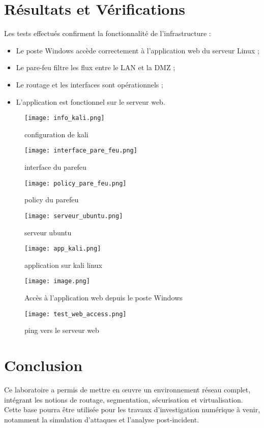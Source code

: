 \documentclass[a4paper,12pt]{report}
\begin{document}
\chapter{Résultats et Vérifications}
Les tests effectués confirment la fonctionnalité de l’infrastructure :
\begin{itemize}
    \item Le poste Windows accède correctement à l’application web du serveur Linux ;
    \item Le pare-feu filtre les flux entre le LAN et la DMZ ;
    \item Le routage et les interfaces sont opérationnels ;
    \item L'application est fonctionnel sur le serveur web.
\end{itemize}

\begin{figure}
    \centering
    \texttt{[image: info\_kali.png]}
    \caption{configuration de kali}
    \label{fig:placeholder}
\end{figure}
\begin{figure}
    \centering
    \texttt{[image: interface\_pare\_feu.png]}
    \caption{interface du parefeu}
    \label{fig:placeholder}
\end{figure}
\begin{figure}
    \centering
    \texttt{[image: policy\_pare\_feu.png]}
    \caption{policy du parefeu}
    \label{fig:placeholder}
\end{figure}
\begin{figure}
    \centering
    \texttt{[image: serveur\_ubuntu.png]}
    \caption{serveur ubuntu}
    \label{fig:placeholder}
\end{figure}
\begin{figure}
    \centering
    \texttt{[image: app\_kali.png]}
    \caption{application sur kali linux}
    \label{fig:placeholder}
\end{figure}
\begin{figure}
        \centering
        \texttt{[image: image.png]}
        \caption{Accès à l’application web depuis le poste Windows}
        \label{fig:placeholder}
    \end{figure}
\begin{figure}[h!]
    \centering
    \texttt{[image: test\_web\_access.png]}
    \caption{ping vers le serveur web}
\end{figure}



\chapter*{Conclusion}
Ce laboratoire a permis de mettre en œuvre un environnement réseau complet, intégrant les notions de routage, segmentation, sécurisation et virtualisation. 
Cette base pourra être utilisée pour les travaux d’investigation numérique à venir, notamment la simulation d’attaques et l’analyse post-incident.
\end{document}
